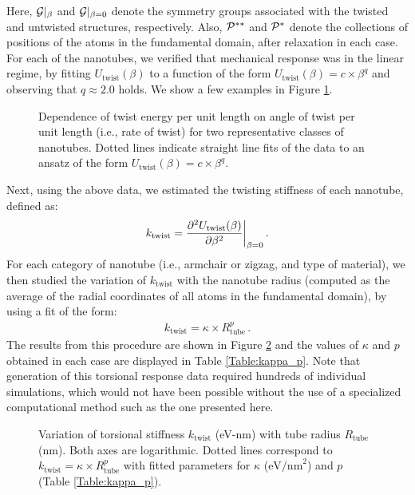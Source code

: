 \documentclass[preprint,12pt, 3p, sort&compress]{elsarticle}
\begin{document}
Here, ${\cal G}|_{\beta}$ and ${\cal G}|_{\beta = 0}$ denote the symmetry groups associated with the twisted and untwisted structures, respectively. Also, ${\cal P}^{**}$ and ${\cal P}^{*}$ denote the collections of positions of the atoms in the fundamental domain, after relaxation in each case. For each of the nanotubes, we verified that mechanical response was in the linear regime, by fitting $U_{\text{twist}}(\beta)$ to a function of the form $U_{\text{twist}}(\beta) = c\times\beta^q$ and observing that $q \approx 2.0$ holds. We show a few examples in Figure \ref{fig:linear_twist}.
\begin{figure}[ht]
\centering
{}\quad
{}
\caption{Dependence of twist energy per unit length on angle of twist per unit length (i.e., rate of twist)  for two representative classes of nanotubes. Dotted lines indicate straight line fits of the data to an ansatz of the form $U_{\text{twist}}(\beta) = c\times\beta^q$.}
\label{fig:linear_twist}
\end{figure}
Next, using the above data, we estimated the twisting stiffness of each nanotube, defined as:
\begin{align}
k_{\text{twist}} = \frac{\partial^{2}U_{\text{twist}}(\beta)}{\partial\beta^{2}}\bigg\rvert_{\beta = 0}\,.
\end{align}
For each category of nanotube (i.e., armchair or zigzag, and type of material), we then studied the variation of $k_{\text{twist}}$ with the nanotube radius (computed as the average of the radial coordinates of all atoms in the fundamental domain), by using a fit of the form:
\begin{align} 
k_{\text{twist}} = \kappa\times R_{\text{tube}}^p\,.
\label{eq:stiffness_eqn}
\end{align}
The results from this procedure are shown in Figure \ref{fig:twist_radius} and the values of $\kappa$ and $p$ obtained in each case are displayed in Table \ref{Table:kappa_p}. Note that generation of this torsional response data required hundreds of individual simulations, which would not have been possible without the use of a specialized computational method such as the one presented here.
\begin{figure}[ht]
\centering
{}\quad
{}
\caption{Variation of torsional stiffness $k_{\text{twist}}$ (eV-nm) with tube radius $R_{\text{tube}}$ (nm). Both axes are logarithmic. Dotted lines correspond to $k_{\text{twist}} = \kappa\times R_{\text{tube}}^p$ with fitted parameters for $\kappa$ ($\text{eV/nm}^2$) and $p$ (Table \ref{Table:kappa_p}).}
\label{fig:twist_radius}
\end{figure}
\end{document}
